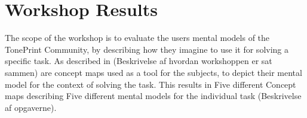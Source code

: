 \chapter{Workshop Results}
\label{Chap:WorkshopResults}

The scope of the workshop is to evaluate the users mental models of the TonePrint Community, by describing how they imagine to use it for solving a specific task. As described in (Beskrivelse af hvordan workshoppen er sat sammen) are concept maps used as a tool for the subjects, to depict their mental model for the context of solving the task. This results in Five different Concept maps describing Five different mental models for the individual task (Beskrivelse af opgaverne). \\
